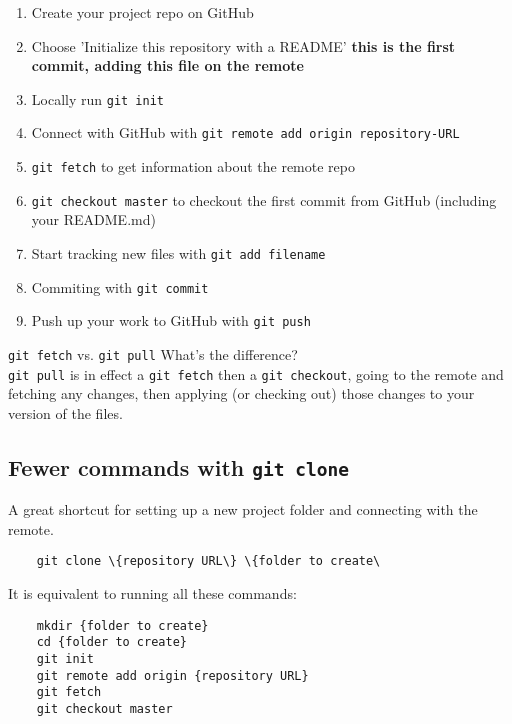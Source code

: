 \begin{enumerate}
    \item Create your project repo on GitHub
    \item Choose 'Initialize this repository with a README' \textbf{this is the first commit, adding this file on the remote}
    \item Locally run \texttt{git init}
    \item Connect with GitHub with \texttt{git remote add origin {repository-URL}}
    \item \texttt{git fetch} to get information about the remote repo
    \item \texttt{git checkout master} to checkout the first commit from GitHub (including your README.md)
    \item Start tracking new files with \texttt{git add {filename}}
    \item Commiting with \texttt{git commit}
    \item Push up your work to GitHub with \texttt{git push}
\end{enumerate}

\begin{infobox}{ \texttt{git fetch} vs. \texttt{git pull}}
    What's the difference?
	\\

    \texttt{git pull} is in effect a \texttt{git fetch} then a \texttt{git checkout}, going to the remote and fetching any changes, then applying (or checking out) those changes to your version of the files.
\end{infobox}


\subsection{Fewer commands with \texttt{git clone}}

A great shortcut for setting up a new project folder and connecting with the remote.
\\

\begin{verbatim}
    git clone \{repository URL\} \{folder to create\
\end{verbatim}


It is equivalent to running all these commands:

\begin{verbatim}
    mkdir {folder to create}
    cd {folder to create}
    git init
    git remote add origin {repository URL}
    git fetch
    git checkout master
\end{verbatim}


